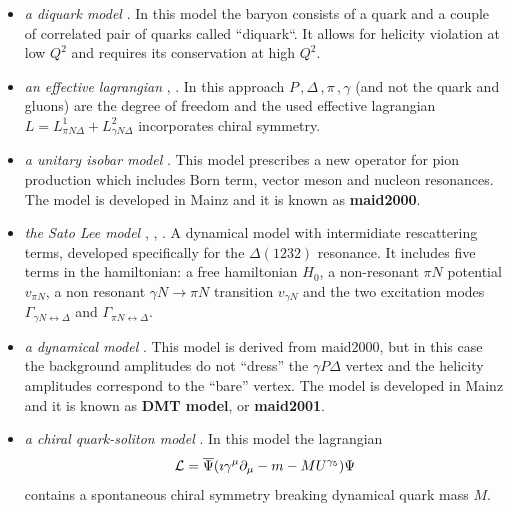 \begin{itemize}
\item {\it a diquark model} \cite{bib:diquark}. In this model the baryon consists of a quark and a couple of correlated
      pair of quarks called ``diquark``. It allows for helicity violation at low $Q^2$ and requires its conservation
      at high $Q^2$.  

\item {\it an effective lagrangian} \cite{bib:efflag1}, \cite{bib:efflag2}. In this approach $P\, ,\Delta\, ,\pi\, ,\gamma$ (and not
      the quark and gluons) are the degree of freedom and 
      the used effective lagrangian $L=L^1_{\pi N\Delta}+L^2_{\gamma N\Delta}$ incorporates chiral symmetry.

\item {\it a unitary isobar model} \cite{bib:maid2000}. This model prescribes a new operator for pion production which includes
      Born term, vector meson and nucleon resonances. The model is developed in Mainz and it is known as {\bf maid2000}.

\item {\it the Sato Lee model} \cite{bib:pion2}, \cite{bib:sato1}, \cite{bib:sato2}. A dynamical model 
      with intermidiate rescattering terms, developed 
      specifically for the $\Delta(1232)$ resonance. 
      It includes five terms in the hamiltonian: a free hamiltonian $H_0$, a non-resonant $\pi N$ potential $v_{\pi N}$, 
      a non resonant $\gamma N\rightarrow \pi N$ transition $v_{\gamma N}$ and the two excitation modes $\Gamma_{\gamma N \leftrightarrow\Delta}$
      and $\Gamma_{\pi N \leftrightarrow\Delta}$.

\item {\it a dynamical model} \cite{bib:dmt2001}. This model is derived from maid2000, but in this
      case the background amplitudes do not ``dress'' the $\gamma P\Delta$ vertex
      and the helicity amplitudes correspond to the ``bare'' vertex. 
      The model is developed in Mainz and it is known as {\bf DMT model}, or {\bf maid2001}.

\item {\it a chiral quark-soliton model} \cite{bib:soli}. In this model the lagrangian 
      $${\cal L }= \overline{\Psi}(\imath\gamma^\mu\partial_\mu - m - MU^{\gamma_5})\Psi$$ contains a spontaneous chiral symmetry breaking
      dynamical quark mass $M$.



\end{itemize}
\newpage




